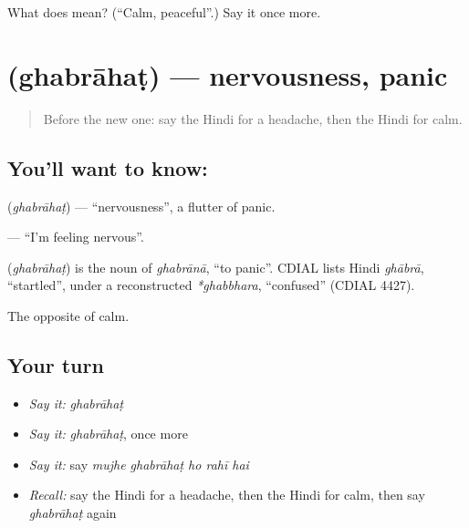 \begin{tcolorbox}[breakable,colback=teal!4,colframe=teal!35!black,title={Before you move on}]
What does  mean? (\textquotedblleft{}Calm, peaceful\textquotedblright{}.) Say it once more.
\end{tcolorbox}
\section[\texorpdfstring{\hi{घबराहट} (ghabrāhaṭ)}{घबराहट (ghabrāhaṭ)}]{ (ghabrāhaṭ) — nervousness, panic}

\label{lesson:HI-C125-ghabrahat}



\begin{quote}
Before the new one: say the Hindi for a headache, then the Hindi for calm.
\end{quote}

\subsection*{You'll want to know: }
\textbf{} (\emph{ghabrāhaṭ}) — \textquotedblleft{}nervousness\textquotedblright{}, a flutter of panic.

\textbf{    } — \textquotedblleft{}I'm feeling nervous\textquotedblright{}.

\begin{cousinweb}
\textbf{} (\emph{ghabrāhaṭ}) is the noun of \emph{ghabrānā}, \textquotedblleft{}to panic\textquotedblright{}. CDIAL lists Hindi \emph{ghābrā}, \textquotedblleft{}startled\textquotedblright{}, under a reconstructed \emph{*ghabbhara}, \textquotedblleft{}confused\textquotedblright{} (CDIAL 4427).
\end{cousinweb}

\begin{grammarlens}[title={What you've built}]
The opposite of calm.
\end{grammarlens}

\subsection*{Your turn}
\begin{itemize}
\raggedright
  \item \emph{Say it:} \emph{ghabrāhaṭ}
  \item \emph{Say it:} \emph{ghabrāhaṭ}, once more
  \item \emph{Say it:} say \emph{mujhe ghabrāhaṭ ho rahī hai}
  \item \emph{Recall:} say the Hindi for a headache, then the Hindi for calm, then say \emph{ghabrāhaṭ} again
\end{itemize}

